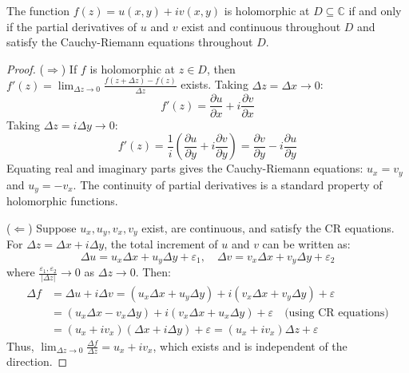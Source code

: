 \begin{theorem}
    The function $f(z) = u(x, y) + iv(x, y)$ is holomorphic at $D \subseteq \mathbb{C}$ if and only if the partial derivatives of $u$ and $v$ exist and continuous throughout $D$ and satisfy the Cauchy-Riemann equations throughout $D$.
\end{theorem}

\begin{proof}
    ($\Rightarrow$) If $f$ is holomorphic at $z \in D$, then $f'(z) = \lim_{\Delta z \to 0} \frac{f(z+\Delta z) - f(z)}{\Delta z}$ exists. 
    Taking $\Delta z = \Delta x \to 0$:
    \[ f'(z) = \frac{\partial u}{\partial x} + i \frac{\partial v}{\partial x} \]
    Taking $\Delta z = i\Delta y \to 0$:
    \[ f'(z) = \frac{1}{i} \left( \frac{\partial u}{\partial y} + i \frac{\partial v}{\partial y} \right) = \frac{\partial v}{\partial y} - i \frac{\partial u}{\partial y} \]
    Equating real and imaginary parts gives the Cauchy-Riemann equations: $u_x = v_y$ and $u_y = -v_x$. The continuity of partial derivatives is a standard property of holomorphic functions.

    ($\Leftarrow$) Suppose $u_x, u_y, v_x, v_y$ exist, are continuous, and satisfy the CR equations. For $\Delta z = \Delta x + i \Delta y$, the total increment of $u$ and $v$ can be written as:
    \[ \Delta u = u_x \Delta x + u_y \Delta y + \varepsilon_1, \quad \Delta v = v_x \Delta x + v_y \Delta y + \varepsilon_2 \]
    where $\frac{\varepsilon_1, \varepsilon_2}{|\Delta z|} \to 0$ as $\Delta z \to 0$. Then:
    \begin{align*}
        \Delta f &= \Delta u + i \Delta v = (u_x \Delta x + u_y \Delta y) + i(v_x \Delta x + v_y \Delta y) + \varepsilon \\
        &= (u_x \Delta x - v_x \Delta y) + i(v_x \Delta x + u_x \Delta y) + \varepsilon \quad \text{(using CR equations)} \\
        &= (u_x + i v_x)(\Delta x + i \Delta y) + \varepsilon = (u_x + i v_x) \Delta z + \varepsilon
    \end{align*}
    Thus, $\lim_{\Delta z \to 0} \frac{\Delta f}{\Delta z} = u_x + i v_x$, which exists and is independent of the direction.
\end{proof}

